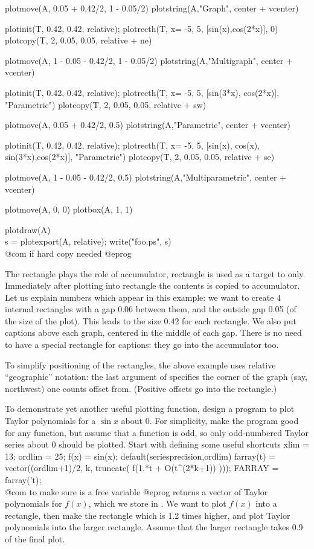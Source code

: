   plotmove(A, 0.05 + 0.42/2, 1 - 0.05/2)
  plotstring(A,"Graph", center + vcenter)

  plotinit(T, 0.42, 0.42, relative);
  plotrecth(T, x= -5, 5, [sin(x),cos(2*x)], 0)
  plotcopy(T, 2, 0.05, 0.05, relative + ne)

  plotmove(A, 1 - 0.05 - 0.42/2, 1 - 0.05/2)
  plotstring(A,"Multigraph", center + vcenter)

  plotinit(T, 0.42, 0.42, relative);
  plotrecth(T, x= -5, 5, [sin(3*x), cos(2*x)], "Parametric")
  plotcopy(T, 2, 0.05, 0.05, relative + sw)

  plotmove(A, 0.05 + 0.42/2, 0.5)
  plotstring(A,"Parametric", center + vcenter)

  plotinit(T, 0.42, 0.42, relative);
  plotrecth(T, x= -5, 5, [sin(x), cos(x), sin(3*x),cos(2*x)], "Parametric")
  plotcopy(T, 2, 0.05, 0.05, relative + se)

  plotmove(A, 1 - 0.05 - 0.42/2, 0.5)
  plotstring(A,"Multiparametric", center + vcenter)

  plotmove(A, 0, 0)
  plotbox(A, 1, 1)

  plotdraw(A)
  \\ s = plotexport(A, relative); write("foo.ps", s) \\ @com if hard copy needed
@eprog

The rectangle  plays the role of accumulator, rectangle  is
used as a target to  only.  Immediately after plotting into
rectangle  the contents is copied to accumulator.  Let us explain
numbers which appear in this example: we want to create 4 internal rectangles
with a gap 0.06 between them, and the outside gap 0.05 (of the size of the
plot).  This leads to the size 0.42 for each rectangle.  We also
put captions above each graph, centered in the middle of each gap.  There
is no need to have a special rectangle for captions: they go into the
accumulator too.

To simplify positioning of the rectangles, the above example uses relative
``geographic'' notation: the last argument of  specifies the
corner of the graph (say, northwest) one counts offset from. (Positive
offsets go into the rectangle.)

To demonstrate yet another useful plotting function, design a program to
plot Taylor polynomials for a $\sin x$ about 0.  For simplicity, make the
program good for any function, but assume that a function is odd, so only
odd-numbered Taylor series about 0 should be plotted.  Start with defining
some useful shortcuts
\bprog
  xlim = 13;  ordlim = 25;  f(x) = sin(x);
  default(seriesprecision,ordlim)
  farray(t) = vector((ordlim+1)/2, k, truncate( f(1.*t + O(t^(2*k+1)) )));
  FARRAY = farray('t);  \\@com{} to make sure  is a free variable
@eprog\noindent
{} returns a vector of Taylor polynomials for $f(x)$, which we
store in .  We want to plot $f(x)$ into a rectangle, then make
the rectangle which is 1.2 times higher, and plot Taylor polynomials into the
larger rectangle.  Assume that the larger rectangle takes 0.9 of the final
plot.


